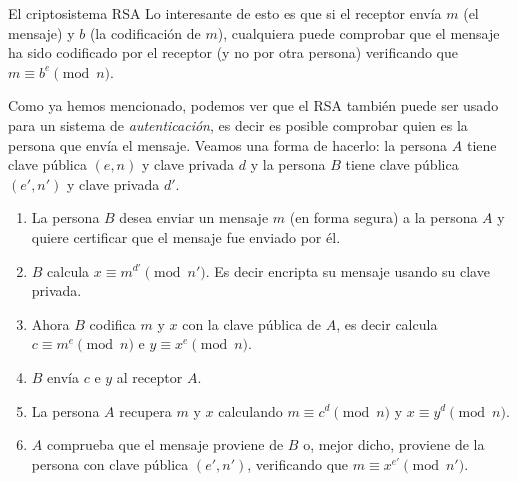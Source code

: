\begin{section}{El criptosistema RSA}
Lo interesante de esto es que si el receptor envía $m$ (el mensaje) y $b$ (la codificación de $m$), cualquiera puede comprobar que el mensaje ha sido codificado por el receptor (y no por otra persona) verificando  que   $m \equiv b^e \pmod{n}$.     


\begin{ejemplo*}
Como ya hemos mencionado, podemos ver que el RSA también puede ser usado para un sistema de \emph{autenticación}, es decir es posible comprobar quien es la persona que envía el mensaje. Veamos una forma de hacerlo: la persona $A$ tiene clave pública $(e,n)$ y clave privada $d$ y   la persona $B$  tiene clave pública $(e',n')$ y clave privada $d'$. 

\begin{enumerate}[label=\textit{\alph*)}]
    \item  La persona $B$ desea enviar un mensaje $m$ (en forma segura) a la persona $A$ y quiere certificar que el mensaje fue enviado por él.
    \item  $B$ calcula $x \equiv m^{d'} \pmod{n'}$. Es decir encripta su mensaje usando su  clave privada.
    \item  Ahora $B$ codifica $m$ y $x$ con la clave pública de $A$, es decir calcula $c \equiv m^{e} \pmod{n}$ e  $y \equiv x^e \pmod{n}$. 
    \item  $B$ envía $c$ e $y$ al receptor $A$.
    \item  La persona $A$ recupera $m$ y $x$ calculando  $m \equiv c^d \pmod{n}$ y  $x \equiv y^d \pmod{n}$.
    \item  $A$ comprueba que el mensaje  proviene de $B$ o, mejor dicho, proviene de la persona con clave pública $(e',n')$, verificando que $m \equiv x^{e'} \pmod{n'}$. 
\end{enumerate}
\end{ejemplo*}

\end{section}


